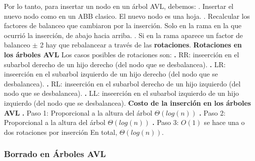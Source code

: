 \documentclass[10pt,a4paper]{article}
\begin{document}
Por lo tanto, para insertar un nodo en un árbol AVL, debemos:
\newline
{}. Insertar el nuevo nodo como en un ABB clasico. El nuevo nodo es una hoja.
\newline
{}. Recalcular los factores de balanceo que cambiaron por la inserción. Solo en la rama en la que ocurrió la inserción, de abajo hacia arriba.
\newline
{}. Si en la rama aparece un factor de balanceo $\pm$ 2 hay que rebalancear a través de las \textbf{rotaciones}.
\newline
\newline
\textbf{Rotaciones en los árboles AVL}
\newline
\newline
Los casos posibles de rotaciones son:
\newline
\newline
\textbf{.} RR: inseerción en el subarbol derecho de un hijo derecho (del nodo que se desbalancea).
\newline
\newline
\textbf{.} LR: inseerción en el subarbol izquierdo de un hijo derecho (del nodo que se desbalancea).
\newline
\newline
\textbf{.} RL: inseerción en el subarbol derecho de un hijo izquierdo (del nodo que se desbalancea).
\newline
\newline
\textbf{.} LL: inseerción en el subarbol izquierdo de un hijo izquierdo (del nodo que se desbalancea).
\newline
\newline
\textbf{Costo de la inserción en los árboles AVL}
\newline
\newline
\textbf{.} Paso 1: Proporcional a la altura del árbol $\Theta(log(n))$
\newline
\newline
\textbf{.} Paso 2: Proporcional a la altura del árbol $\Theta(log(n))$
\newline
\newline
\textbf{.} Paso 3: $O(1)$ se hace una o dos rotaciones por inserción
\newline
\newline
En total, $\Theta(log(n))$. 
\newpage

\subsubsection{Borrado en Árboles AVL}
\end{document}

